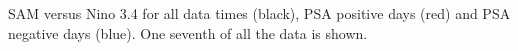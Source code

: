 \label{fig:sam_v_enso}
SAM versus Nino 3.4 for all data times (black), PSA positive days (red) and PSA negative days (blue). One seventh of all the data is shown.